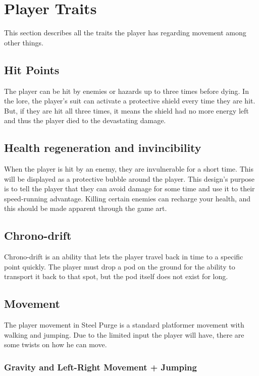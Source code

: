 \documentclass[../Main.tex]{subfiles}
\begin{document}
\section{Player Traits}

This section describes all the traits the player has regarding movement among other things.

\subsection{Hit Points}

The player can be hit by enemies or hazards up to three times before dying. In the lore, the player's suit can activate a protective shield every time they are hit. But, if they are hit all three times, it means the shield had no more energy left and thus the player died to the devastating damage. 


\subsection{Health regeneration and invincibility}

When the player is hit by an enemy, they are invulnerable for a short time. This will be displayed as a protective bubble around the player. This design's purpose is to tell the player that they can avoid damage for some time and use it to their speed-running advantage. Killing certain enemies can recharge your health, and this should be made apparent through the game art. 

\subsection{Chrono-drift}

Chrono-drift is an ability that lets the player travel back in time to a specific point quickly. The player must drop a pod on the ground for the ability to transport it back to that spot, but the pod itself does not exist for long. 

\subsection{Movement}

The player movement in Steel Purge is a standard platformer movement with walking and jumping. Due to the limited input the player will have, there are some twists on how he can move.

\subsubsection{Gravity and Left-Right Movement + Jumping}
\end{document}
